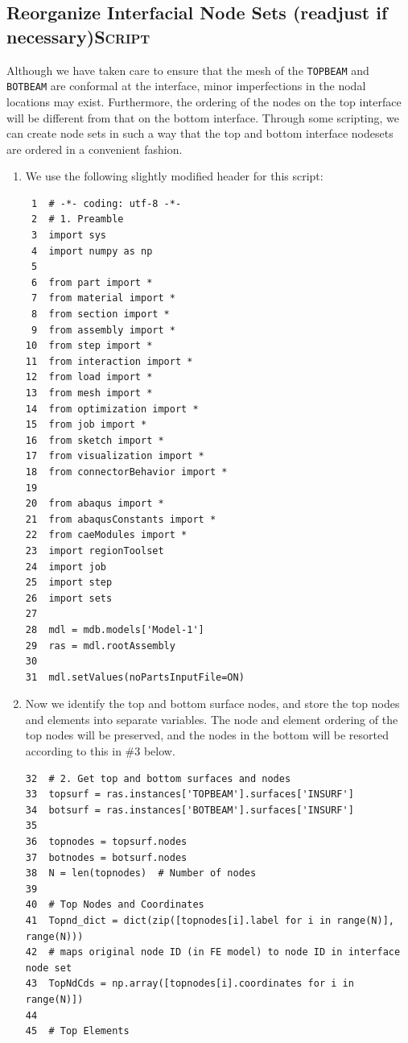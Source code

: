 \documentclass[11pt]{article}
\begin{document}
\subsection{Reorganize Interfacial Node Sets (readjust if necessary)\hfill{}\textsc{Script}}
\label{sec:orgafa563e}
Although we have taken care to ensure that the mesh of the \texttt{TOPBEAM} and \texttt{BOTBEAM} are conformal at the interface, minor imperfections in the nodal locations may exist.
Furthermore, the ordering of the nodes on the top interface will be different from that on the bottom interface.
Through some scripting, we can create node sets in such a way that the top and bottom interface nodesets are ordered in a convenient fashion.
\begin{enumerate}
\item We use the following slightly modified header for this script:
\begin{verbatim}
 1  # -*- coding: utf-8 -*-
 2  # 1. Preamble
 3  import sys
 4  import numpy as np
 5  
 6  from part import *
 7  from material import *
 8  from section import *
 9  from assembly import *
10  from step import *
11  from interaction import *
12  from load import *
13  from mesh import *
14  from optimization import *
15  from job import *
16  from sketch import *
17  from visualization import *
18  from connectorBehavior import *
19  
20  from abaqus import *
21  from abaqusConstants import *
22  from caeModules import * 
23  import regionToolset
24  import job
25  import step
26  import sets
27  
28  mdl = mdb.models['Model-1']
29  ras = mdl.rootAssembly
30  
31  mdl.setValues(noPartsInputFile=ON)
\end{verbatim}
\item Now we identify the top and bottom surface nodes, and store the top nodes and elements into separate variables.
The node and element ordering of the top nodes will be preserved, and the nodes in the bottom will be resorted according to this in \#3 below.
\begin{verbatim}
32  # 2. Get top and bottom surfaces and nodes
33  topsurf = ras.instances['TOPBEAM'].surfaces['INSURF']
34  botsurf = ras.instances['BOTBEAM'].surfaces['INSURF']
35  
36  topnodes = topsurf.nodes
37  botnodes = botsurf.nodes
38  N = len(topnodes)  # Number of nodes
39  
40  # Top Nodes and Coordinates
41  Topnd_dict = dict(zip([topnodes[i].label for i in range(N)], range(N)))
42  # maps original node ID (in FE model) to node ID in interface node set
43  TopNdCds = np.array([topnodes[i].coordinates for i in range(N)])
44  
45  # Top Elements

\end{verbatim}
\end{enumerate}
\end{document}

